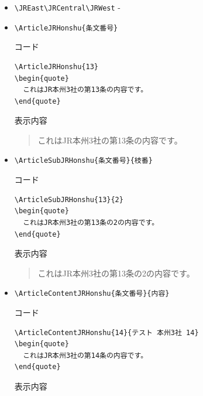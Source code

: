 \documentclass[oneside,10pt,a4paper]{jsarticle}
\begin{document}
  \begin{itemize}
    \item \verb|\JREast\JRCentral\JRWest| - \JREast\JRCentral\JRWest
    \item \verb|\ArticleJRHonshu{条文番号}|
      \begin{itembox}[l]{コード}
        \begin{verbatim}
\ArticleJRHonshu{13}
\begin{quote}
  これはJR本州3社の第13条の内容です。
\end{quote}\end{verbatim}
      \end{itembox}
      \begin{itembox}[l]{表示内容}
        \begin{quote}
          これはJR本州3社の第13条の内容です。
        \end{quote}
      \end{itembox}
    \item \verb|\ArticleSubJRHonshu{条文番号}{枝番}|
      \begin{itembox}[l]{コード}
        \begin{verbatim}
\ArticleSubJRHonshu{13}{2}
\begin{quote}
  これはJR本州3社の第13条の2の内容です。
\end{quote}\end{verbatim}
      \end{itembox}
      \begin{itembox}[l]{表示内容}
        \begin{quote}
          これはJR本州3社の第13条の2の内容です。
        \end{quote}
      \end{itembox}
    \newpage
    \item \verb|\ArticleContentJRHonshu{条文番号}{内容}|
      \begin{itembox}[l]{コード}
        \begin{verbatim}
\ArticleContentJRHonshu{14}{テスト 本州3社 14}
\begin{quote}
  これはJR本州3社の第14条の内容です。
\end{quote}\end{verbatim}
      \end{itembox}
      \begin{itembox}[l]{表示内容}
        \begin{quote}

\end{quote}
\end{itembox}
\end{itemize}
\end{document}
